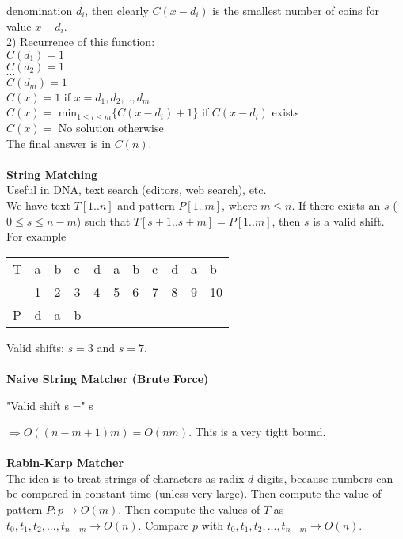 \documentclass[8pt,letterpaper,twocolumn]{article}
\begin{document}
denomination $d_i$, then clearly $C(x-d_i)$ is the smallest number of coins for value $x - d_i$.\\
2) Recurrence of this function:\\
$C(d_1) = 1$\\
$C(d_2) = 1$\\
$\cdots$\\
$C(d_m) = 1$\\
$C(x) = 1$ if $x=d_1,d_2,..,d_m$\\
$C(x) = $ min$_{1 \leq i \leq m}\{C(x - d_i) + 1\}$ if $C(x - d_i)$ exists\\
$C(x) = $ No solution otherwise\\
The final answer is in $C(n)$.\\
\\
\underline{\textbf{String Matching}}\\
Useful in DNA, text search (editors, web search), etc.\\
We have text $T[1..n]$ and pattern $P[1..m]$, where $m \leq n$.
If there exists an $s$ ($0 \leq s \leq n-m$) such that $T[s+1..s+m]=P[1..m]$, then $s$ is a valid shift.\\
For example
\begin{tabular}{l|l|l|l|l|l|l|l|l|l|l|}
\hline
T & a & b & c & d & a & b & c & d & a & b\\
& 1&2&3&4&5&6&7&8&9&10\\
\hline
P & d & a & b\\
\hline
\end{tabular}
Valid shifts: $s=3$ and $s=7$.\\
\\
\textbf{Naive String Matcher (Brute Force)}\\
\begin{algorithmic}
    \PRINT "Valid shift s =" s
  \ENDIF
\ENDFOR
\end{algorithmic}
$\Rightarrow O((n-m+1)m) = O(nm)$. This is a very tight bound.\\
\\
\textbf{Rabin-Karp Matcher}\\
The idea is to treat strings of characters as radix-$d$ digits, because numbers can be compared in constant
time (unless very large). Then compute the value of pattern $P:p \rightarrow O(m)$. Then compute the values
of $T$ as $t_0,t_1,t_2,...,t_{n-m} \rightarrow O(n)$. Compare $p$ with $t_0,t_1,t_2,...,t_{n-m} \rightarrow O(n)$.\\
\end{document}
